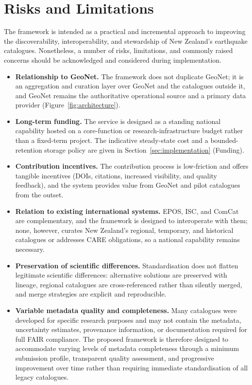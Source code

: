 \documentclass[11pt]{article}
\begin{document}
\section{Risks and Limitations}
The framework is intended as a practical and incremental approach to improving the discoverability, interoperability, and stewardship of New Zealand's earthquake catalogues. Nonetheless, a number of risks, limitations, and commonly raised concerns should be acknowledged and considered during implementation.
\begin{itemize}
\setlength{\itemsep}{2pt}
\item \textbf{Relationship to GeoNet.} The framework does not duplicate GeoNet; it is an aggregation and curation layer over GeoNet and the catalogues outside it, and GeoNet remains the authoritative operational source and a primary data provider (Figure~\ref{fig:architecture}).
\item \textbf{Long-term funding.} The service is designed as a standing national capability hosted on a core-function or research-infrastructure budget rather than a fixed-term project. The indicative steady-state cost and a bounded-retention storage policy are given in Section~\ref{sec:implementation} (Funding).
\item \textbf{Contribution incentives.} The contribution process is low-friction and offers tangible incentives (DOIs, citations, increased visibility, and quality feedback), and the system provides value from GeoNet and pilot catalogues from the outset.
\item \textbf{Relation to existing international systems.} EPOS, ISC, and ComCat are complementary, and the framework is designed to interoperate with them; none, however, curates New Zealand's regional, temporary, and historical catalogues or addresses CARE obligations, so a national capability remains necessary.
\item \textbf{Preservation of scientific differences.} Standardisation does not flatten legitimate scientific differences: alternative solutions are preserved with lineage, regional catalogues are cross-referenced rather than silently merged, and merge strategies are explicit and reproducible.
\item \textbf{Variable metadata quality and completeness.} Many catalogues were developed for specific research purposes and may not contain the metadata, uncertainty estimates, provenance information, or documentation required for full FAIR compliance. The proposed framework is therefore designed to accommodate varying levels of metadata completeness through a minimum submission profile, transparent quality assessment, and progressive improvement over time rather than requiring immediate standardisation of all legacy catalogues. 

\end{itemize}
\end{document}
